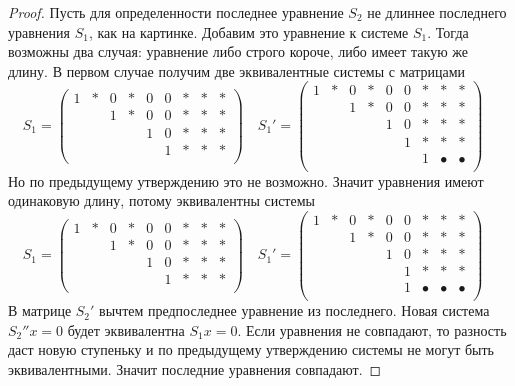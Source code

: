 \begin{proof}
Пусть для определенности последнее уравнение $S_2$ не длиннее последнего уравнения $S_1$, как на картинке.
Добавим это уравнение к системе $S_1$.
Тогда возможны два случая: уравнение либо строго короче, либо имеет такую же длину.
В первом случае получим две эквивалентные системы с матрицами
\[
S_1 = 
\begin{pmatrix}
{1}&{*}&{0}&{*}&{0}&{0}&{*}&{*}&{*}\\
{}&{}&{1}&{*}&{0}&{0}&{*}&{*}&{*}\\
{}&{}&{}&{}&{1}&{0}&{*}&{*}&{*}\\
{}&{}&{}&{}&{}&{1}&{*}&{*}&{*}\\
\end{pmatrix}\quad
S_1' = 
\begin{pmatrix}
{1}&{*}&{0}&{*}&{0}&{0}&{*}&{*}&{*}\\
{}&{}&{1}&{*}&{0}&{0}&{*}&{*}&{*}\\
{}&{}&{}&{}&{1}&{0}&{*}&{*}&{*}\\
{}&{}&{}&{}&{}&{1}&{*}&{*}&{*}\\
{}&{}&{}&{}&{}&{}&{1}&{\bullet}&{\bullet}\\
\end{pmatrix}\quad
\]
Но по предыдущему утверждению это не возможно.
Значит уравнения имеют одинаковую длину, потому эквивалентны системы
\[
S_1 = 
\begin{pmatrix}
{1}&{*}&{0}&{*}&{0}&{0}&{*}&{*}&{*}\\
{}&{}&{1}&{*}&{0}&{0}&{*}&{*}&{*}\\
{}&{}&{}&{}&{1}&{0}&{*}&{*}&{*}\\
{}&{}&{}&{}&{}&{1}&{*}&{*}&{*}\\
\end{pmatrix}\quad
S_1' = 
\begin{pmatrix}
{1}&{*}&{0}&{*}&{0}&{0}&{*}&{*}&{*}\\
{}&{}&{1}&{*}&{0}&{0}&{*}&{*}&{*}\\
{}&{}&{}&{}&{1}&{0}&{*}&{*}&{*}\\
{}&{}&{}&{}&{}&{1}&{*}&{*}&{*}\\
{}&{}&{}&{}&{}&{1}&{\bullet}&{\bullet}&{\bullet}\\
\end{pmatrix}\quad
\]
В матрице $S_2'$ вычтем предпоследнее уравнение из последнего.
Новая система  $S_2''x=0$ будет эквивалентна $S_1x =0$.
Если уравнения не совпадают, то разность даст новую ступеньку и по предыдущему утверждению системы не могут быть эквивалентными.
Значит последние уравнения совпадают.


\end{proof}
